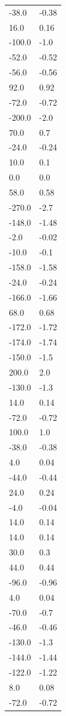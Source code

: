 \begin{longtable}{ll}
-38.0 & -0.38 \\
16.0 & 0.16 \\
-100.0 & -1.0 \\
-52.0 & -0.52 \\
-56.0 & -0.56 \\
92.0 & 0.92 \\
-72.0 & -0.72 \\
-200.0 & -2.0 \\
70.0 & 0.7 \\
-24.0 & -0.24 \\
10.0 & 0.1 \\
0.0 & 0.0 \\
58.0 & 0.58 \\
-270.0 & -2.7 \\
-148.0 & -1.48 \\
-2.0 & -0.02 \\
-10.0 & -0.1 \\
-158.0 & -1.58 \\
-24.0 & -0.24 \\
-166.0 & -1.66 \\
68.0 & 0.68 \\
-172.0 & -1.72 \\
-174.0 & -1.74 \\
-150.0 & -1.5 \\
200.0 & 2.0 \\
-130.0 & -1.3 \\
14.0 & 0.14 \\
-72.0 & -0.72 \\
100.0 & 1.0 \\
-38.0 & -0.38 \\
4.0 & 0.04 \\
-44.0 & -0.44 \\
24.0 & 0.24 \\
-4.0 & -0.04 \\
14.0 & 0.14 \\
14.0 & 0.14 \\
30.0 & 0.3 \\
44.0 & 0.44 \\
-96.0 & -0.96 \\
4.0 & 0.04 \\
-70.0 & -0.7 \\
-46.0 & -0.46 \\
-130.0 & -1.3 \\
-144.0 & -1.44 \\
-122.0 & -1.22 \\
8.0 & 0.08 \\
-72.0 & -0.72 \\

\end{longtable}

